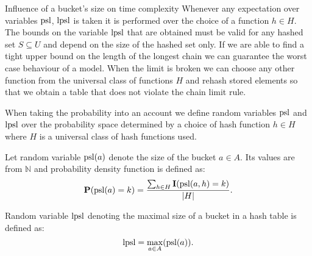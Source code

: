 \begin{section}{Influence of a bucket's size on time complexity}
Whenever any expectation over variables $\mathrm{psl}$, $\mathrm{lpsl}$ is taken it is performed over the choice of a function $h \in H$. The bounds on the variable $\mathrm{lpsl}$ that are obtained must be valid for any hashed set $S \subseteq U$ and depend on the size of the hashed set only. If we are able to find a tight upper bound on the length of the longest chain we can guarantee the worst case behaviour of a model. When the limit is broken we can choose any other function from the universal class of functions $H$ and rehash stored elements so that we obtain a table that does not violate the chain limit rule.

When taking the probability into an account we define random variables $\mathrm{psl}$ and $\mathrm{lpsl}$ over the probability space determined by a choice of hash function $h \in H$ where $H$ is a universal class of hash functions used.

\begin{definition}
Let random variable $\mathrm{psl}(a)$ denote the size of the bucket $a \in A$. Its values are from $\mathbb{N}$ and probability density function is defined as:
\[
\mathbf{P}(\mathrm{psl}(a) = k) = \frac{\sum_{h \in H} \mathbf{I}(\mathrm{psl}(a, h) = k)}{|H|}\text{.}
\]

Random variable $\mathrm{lpsl}$ denoting the maximal size of a bucket in a hash table is defined as:
\[
\mathrm{lpsl} = \displaystyle\max_{a \in A}(\mathrm{psl}(a))\text{.}
\]
\end{definition}
\end{section}

